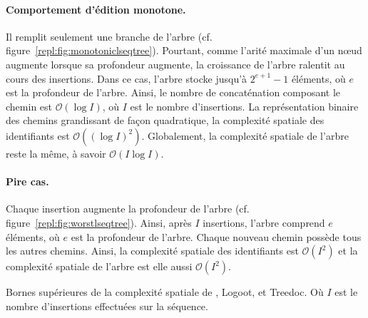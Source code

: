 \paragraph{Comportement d'édition monotone.} Il remplit seulement une branche de
l'arbre (cf. figure~\ref{repl:fig:monotoniclseqtree}). Pourtant, comme l'arité
maximale d'un nœud augmente lorsque sa profondeur augmente, la croissance de
l'arbre ralentit au cours des insertions. Dans ce cas, l'arbre stocke jusqu'à
$2^{e+1}-1$ éléments, où $e$ est la profondeur de l'arbre. Ainsi, le nombre de
concaténation composant le chemin est $\mathcal{O}(\log I)$, où $I$ est le
nombre d'insertions. La représentation binaire des chemins grandissant de façon
quadratique, la complexité spatiale des identifiants est
$\mathcal{O}((\log I)^2)$. Globalement, la complexité spatiale de l'arbre reste
la même, à savoir $\mathcal{O}(I \log I)$.

\paragraph{Pire cas.} Chaque insertion augmente la profondeur de l'arbre
(cf. figure~\ref{repl:fig:worstlseqtree}). Ainsi, après $I$ insertions, l'arbre
comprend $e$ éléments, où $e$ est la profondeur de l'arbre. Chaque nouveau
chemin possède tous les autres chemins. Ainsi, la complexité spatiale des
identifiants est $\mathcal{O}(I^2)$ et la complexité spatiale de l'arbre est
elle aussi $\mathcal{O}(I^2)$.

\begin{table}
  \begin{center}
    \caption[Bornes supérieures de la complexité spatiale de \LSEQ, Logoot, et
    Treedoc] {\label{repl:table:lseqspace} Bornes supérieures de la complexité
      spatiale de \LSEQ, Logoot, et Treedoc. Où $I$ est le nombre d'insertions
      effectuées sur la séquence.}
    
  \end{center}
\end{table}

